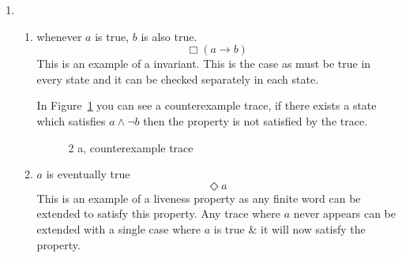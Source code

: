 \documentclass{article}
\begin{document}
\begin{enumerate}
    \item 
        \begin{enumerate}[label=(\alph*)]
            \item whenever $a$ is true, $b$ is also true.
                \begin{equation}
                    \Box(a \rightarrow b)
                \end{equation}
                This is an example of a invariant. This is the case as must be true in every state and it can be checked separately in each state.

                In Figure~\ref{fig:2a} you can see a counterexample trace, if there exists a state which satisfies $a \wedge \neg b$ then the property is not satisfied by the trace.
                \begin{figure}[htpb]
                    \centering
                    \caption{2 a, counterexample trace}%
                    \label{fig:2a}
                \end{figure}
            \item $a$ is eventually true
                \begin{equation}
                    \Diamond a
                \end{equation}
                This is an example of a liveness property as any finite word can be extended to satisfy this property. Any trace where $a$ never appears can be extended with a single case where $a$ is true \& it will now satisfy the property.


\end{enumerate}
\end{enumerate}
\end{document}
